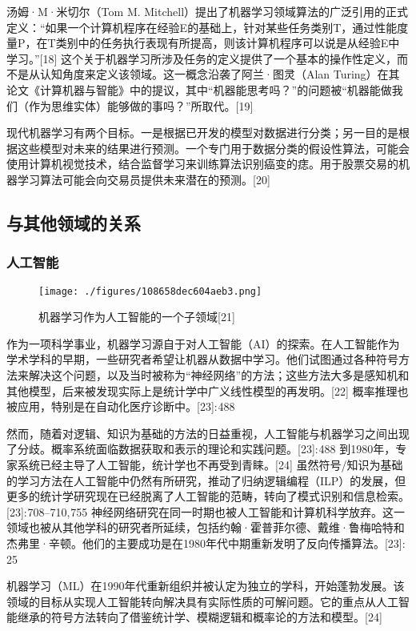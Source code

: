 汤姆·M·米切尔（Tom M. Mitchell）提出了机器学习领域算法的广泛引用的正式定义：“如果一个计算机程序在经验E的基础上，针对某些任务类别T，通过性能度量P，在T类别中的任务执行表现有所提高，则该计算机程序可以说是从经验E中学习。”[18] 这个关于机器学习所涉及任务的定义提供了一个基本的操作性定义，而不是从认知角度来定义该领域。这一概念沿袭了阿兰·图灵（Alan Turing）在其论文《计算机器与智能》中的提议，其中“机器能思考吗？”的问题被“机器能做我们（作为思维实体）能够做的事吗？”所取代。[19]

现代机器学习有两个目标。一是根据已开发的模型对数据进行分类；另一目的是根据这些模型对未来的结果进行预测。一个专门用于数据分类的假设性算法，可能会使用计算机视觉技术，结合监督学习来训练算法识别癌变的痣。用于股票交易的机器学习算法可能会向交易员提供未来潜在的预测。[20]
\subsection{与其他领域的关系}  
\subsubsection{人工智能}
\begin{figure}[ht]
\centering
\texttt{[image: ./figures/108658dec604aeb3.png]}
\caption{机器学习作为人工智能的一个子领域[21]} \label{fig_JQXX_1}
\end{figure}
作为一项科学事业，机器学习源自于对人工智能（AI）的探索。在人工智能作为学术学科的早期，一些研究者希望让机器从数据中学习。他们试图通过各种符号方法来解决这个问题，以及当时被称为“神经网络”的方法；这些方法大多是感知机和其他模型，后来被发现实际上是统计学中广义线性模型的再发明。[22] 概率推理也被应用，特别是在自动化医疗诊断中。[23]: 488

然而，随着对逻辑、知识为基础的方法的日益重视，人工智能与机器学习之间出现了分歧。概率系统面临数据获取和表示的理论和实践问题。[23]: 488 到1980年，专家系统已经主导了人工智能，统计学也不再受到青睐。[24] 虽然符号/知识为基础的学习方法在人工智能中仍然有所研究，推动了归纳逻辑编程（ILP）的发展，但更多的统计学研究现在已经脱离了人工智能的范畴，转向了模式识别和信息检索。[23]: 708–710, 755 神经网络研究在同一时期也被人工智能和计算机科学放弃。这一领域也被从其他学科的研究者所延续，包括约翰·霍普菲尔德、戴维·鲁梅哈特和杰弗里·辛顿。他们的主要成功是在1980年代中期重新发明了反向传播算法。[23]: 25

机器学习（ML）在1990年代重新组织并被认定为独立的学科，开始蓬勃发展。该领域的目标从实现人工智能转向解决具有实际性质的可解问题。它的重点从人工智能继承的符号方法转向了借鉴统计学、模糊逻辑和概率论的方法和模型。[24]
